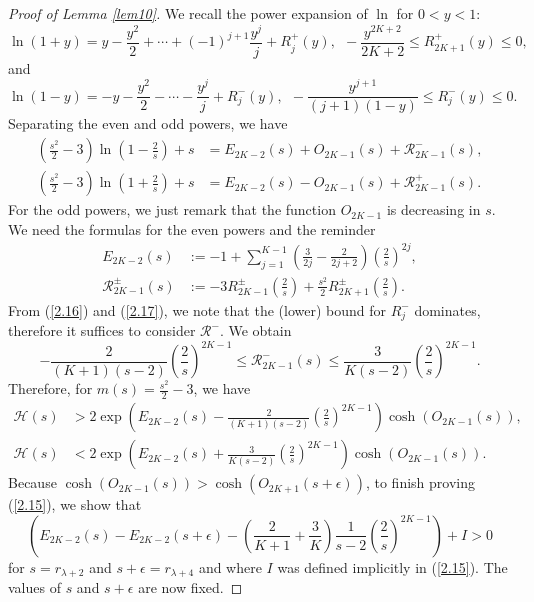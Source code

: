 \documentclass{amsart}
\theoremstyle{Corollary}
\numberwithin{equation}{section}
\begin{document}
\begin{proof}[Proof of Lemma \ref{lem10}]
We recall the power expansion of $\ln$ for $0<y<1$:
\begin{equation}\label{2.16}
\ln(1+y)=y-\frac{y^2}{2}+\cdots+(-1)^{j+1}\frac{y^j}{j}+R_j^+(y),~~-\frac{y^{2K+2}}{2K+2}\leq R_{2K+1}^+(y)\leq 0,
\end{equation}
and
\begin{equation}\label{2.17}
\ln(1-y)=-y-\frac{y^2}{2}-\cdots-\frac{y^j}{j}+R_j^-(y),~~-\frac{y^{j+1}}{(j+1)(1-y)}\leq R_j^-(y)\leq 0.
\end{equation}
Separating the even and odd powers, we have
\begin{equation*}
\begin{split}
\left(\frac{s^2}{2}-3\right)\ln\left(1-\frac{2}{s}\right)+s&=E_{2K-2}(s)+O_{2K-1}(s)+\mathcal{R}^-_{2K-1}(s),\\
\left(\frac{s^2}{2}-3\right)\ln\left(1+\frac{2}{s}\right)+s&=E_{2K-2}(s)-O_{2K-1}(s)+\mathcal{R}^+_{2K-1}(s).
\end{split}
\end{equation*}
For the odd powers, we just remark that the function $O_{2K-1}$ is decreasing in $s$.
We need the formulas for the even powers and the reminder
\begin{equation*}
\begin{split}
E_{2K-2}(s)&:=-1+\sum_{j=1}^{K-1}\left(\frac{3}{2j}-\frac{2}{2j+2}\right)\left(\frac{2}{s}\right)^{2j},\\
\mathcal{R}^{\pm}_{2K-1}(s)&:=-3R_{2K-1}^{\pm}(\frac{2}{s})+\frac{s^2}{2}R_{2K+1}^{\pm}(\frac{2}{s}).
\end{split}
\end{equation*}
From (\ref{2.16}) and (\ref{2.17}), we note that the (lower) bound for $R_j^-$ dominates,
therefore it suffices to consider $\mathcal{R}^-$. We obtain
\begin{equation*}
 -\frac{2}{(K+1)(s-2)}\left(\frac{2}{s}\right)^{2K-1}
 \leq  \mathcal{R}^-_{2K-1}(s)
 \leq
 \frac{3}{K(s-2)}\left(\frac{2}{s}\right)^{2K-1}.
\end{equation*}
Therefore, for $m(s)=\frac{s^2}{2}-3$, we have
\begin{equation*}
\begin{split}
\mathcal{H}(s)&>2\exp\left(E_{2K-2}(s)-\frac{2}{(K+1)(s-2)}\left(\frac{2}{s}\right)^{2K-1} \right)\cosh(O_{2K-1}(s)),\\
\mathcal{H}(s)&<2\exp\left(E_{2K-2}(s)+\frac{3}{K(s-2)}\left(\frac{2}{s}\right)^{2K-1} \right)\cosh(O_{2K-1}(s)).
\end{split}
\end{equation*}
Because $\cosh(O_{2K-1}(s))>\cosh(O_{2K+1}(s+\epsilon))$,
to finish proving (\ref{2.15}), we show that
\begin{equation}\label{2.18}
\left(E_{2K-2}(s)-E_{2K-2}(s+\epsilon)-\left(\frac{2}{K+1}+\frac{3}{K}\right)\frac{1}{s-2}\left(\frac{2}{s}\right)^{2K-1}\right)+I>0
\end{equation}
for $s=r_{\lambda+2}$ and $s+\epsilon=r_{\lambda+4}$
and where $I$ was defined implicitly in (\ref{2.15}).
The values of $s$ and $s+\epsilon$ are now fixed.



\end{proof}
\end{document}
